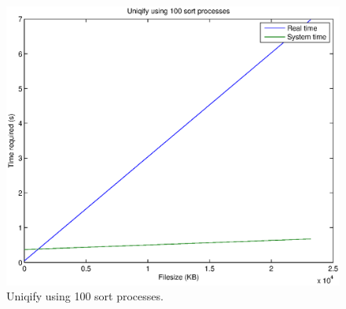 \documentclass[letterpaper,10pt,titlepage]{article}
\begin{document}
\begin{figure}[H]
	\begin{center}
	\includegraphics[width=8in]{figure3}
	\end{center}
	\caption{Uniqify using 100 sort processes.}
\end{figure}
%
\end{document}
